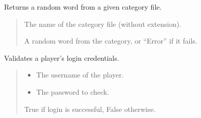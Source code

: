 \documentclass[letterpaper,10pt,english]{sphinxmanual}
\begin{document}
\begin{fulllineitems}
\label{\detokenize{modules:Database_Logic.get_word_from_category}}
\pysigstartsignatures
{}
\pysigstopsignatures
\sphinxAtStartPar
Returns a random word from a given category file.
\begin{quote}\begin{description}
\sphinxAtStartPar
{} \textendash{} The name of the category file (without extension).

\sphinxAtStartPar
A random word from the category, or “Error” if it fails.

\end{description}\end{quote}

\end{fulllineitems}


\begin{fulllineitems}
\label{\detokenize{modules:Database_Logic.login}}
\pysigstartsignatures
{}
\pysigstopsignatures
\sphinxAtStartPar
Validates a player’s login credentials.
\begin{quote}\begin{description}
\begin{itemize}
\item {} 
\sphinxAtStartPar
{} \textendash{} The username of the player.

\item {} 
\sphinxAtStartPar
{} \textendash{} The password to check.

\end{itemize}

\sphinxAtStartPar
True if login is successful, False otherwise.

\end{description}\end{quote}

\end{fulllineitems}
\end{document}
